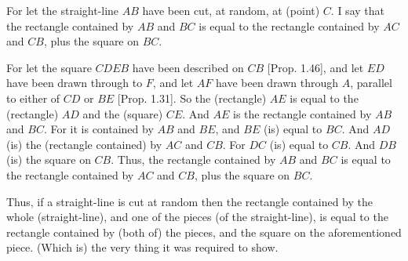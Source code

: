 \begin{Parallel}{}{}
{For let the straight-line $AB$ have been cut, at random, at (point) $C$.
I say that the rectangle contained by $AB$ and $BC$ is equal to the
rectangle contained by $AC$ and $CB$, plus the square on $BC$.

For let the square $CDEB$ have been described on $CB$ [Prop. 1.46],
and let $ED$ have been drawn through to $F$, and let $AF$ have been
drawn through $A$, parallel to either of $CD$ or $BE$ [Prop. 1.31].
So the (rectangle) $AE$ is equal to the (rectangle) $AD$ and the (square) $CE$.
And $AE$ is the rectangle contained by $AB$ and $BC$.
For it is contained by $AB$ and $BE$, and $BE$ (is) equal to $BC$. And
$AD$ (is) the (rectangle contained) by $AC$ and $CB$. For $DC$
(is) equal to $CB$. And $DB$ (is) the square on $CB$. Thus, the rectangle
contained by $AB$ and $BC$ is equal to the rectangle contained by $AC$ and
$CB$, plus the square on $BC$.

Thus, if a straight-line is cut at random then the rectangle contained by the
whole (straight-line),  and one of the pieces (of the straight-line),
is equal to the rectangle contained by (both of) the pieces, and the square on
the aforementioned piece. (Which is) the very thing it was required
to show.}
\end{Parallel}


\vspace{7pt}{\footnotesize \noindent$^\dag$ This proposition is a geometric version
of the algebraic identity: $(a+b)\,a = a\,b + a^2$.}

